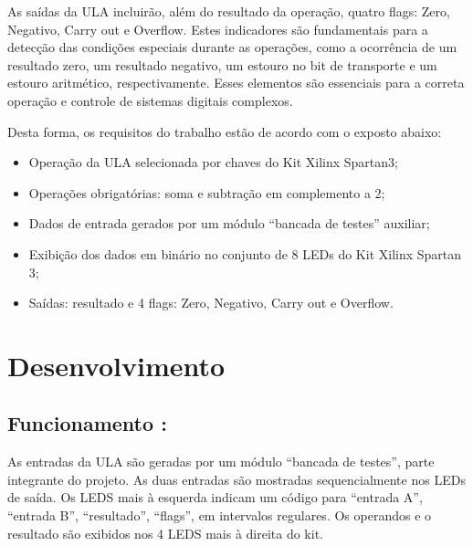 \documentclass[11pt]{book}
\begin{document}
    As saídas da ULA incluirão, além do resultado da operação, quatro flags: Zero, Negativo, Carry out e Overflow. Estes indicadores são fundamentais para a detecção das condições especiais durante as operações, como a ocorrência de um resultado zero, um resultado negativo, um estouro no bit de transporte e um estouro aritmético, respectivamente. Esses elementos são essenciais para a correta operação e controle de sistemas digitais complexos.
    
    Desta forma, os requisitos do trabalho estão de acordo com o exposto abaixo:
        \begin{itemize}
              \item  Operação da ULA selecionada por chaves do Kit Xilinx Spartan3;
              \item Operações obrigatórias: soma e subtração em complemento a 2;
              \item Dados de entrada gerados por um módulo “bancada de testes” auxiliar;
              \item Exibição dos dados em binário no conjunto de 8 LEDs do Kit Xilinx Spartan 3;
              \item Saídas: resultado e 4 flags: Zero, Negativo, Carry out e Overflow.
        \end{itemize}
    
    \chapter{Desenvolvimento}
        \section{Funcionamento :}
        As entradas da ULA são geradas por um módulo “bancada de testes”, parte integrante do projeto. As duas entradas são mostradas sequencialmente nos LEDs de saída. Os LEDS mais à esquerda indicam um código para “entrada A”, “entrada B”, “resultado”, “flags”, em intervalos regulares. Os operandos e o resultado são exibidos nos 4 LEDS mais à direita do kit.
\end{document}
